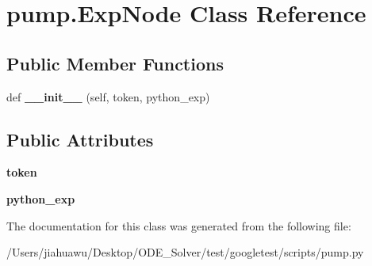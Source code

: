 \hypertarget{classpump_1_1_exp_node}{}\section{pump.\+Exp\+Node Class Reference}
\label{classpump_1_1_exp_node}
\subsection*{Public Member Functions}
\begin{DoxyCompactItemize}
\item 
\mbox{\label{classpump_1_1_exp_node_a0808c394c4d3c8ac875005caa1b3e1b3}} 
def {\bfseries \+\_\+\+\_\+init\+\_\+\+\_\+} (self, token, python\+\_\+exp)
\end{DoxyCompactItemize}
\subsection*{Public Attributes}
\begin{DoxyCompactItemize}
\item 
\mbox{\label{classpump_1_1_exp_node_ade05a5a32535d717dc5c194569aaf356}} 
{\bfseries token}
\item 
\mbox{\label{classpump_1_1_exp_node_adccfe4778c2e34f6b2c88118c0f1587f}} 
{\bfseries python\+\_\+exp}
\end{DoxyCompactItemize}


The documentation for this class was generated from the following file\+:\begin{DoxyCompactItemize}
\item 
/\+Users/jiahuawu/\+Desktop/\+O\+D\+E\+\_\+\+Solver/test/googletest/scripts/pump.\+py\end{DoxyCompactItemize}
